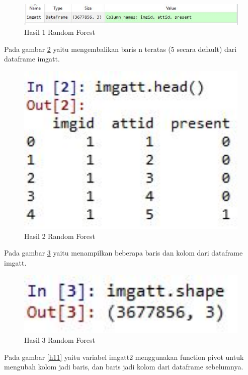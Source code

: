 \begin{enumerate}
\begin{figure}[!htbp]
	\centerline{\includegraphics[width=1\textwidth]{figures/huda/chapter3_praktek/4.JPG}}
	\caption{Hasil 1 Random Forest}
	\label{h8}
\end{figure}
\subitem Pada gambar \ref{h9} yaitu mengembalikan baris n teratas (5 secara default) dari dataframe imgatt.
\begin{figure}[!htbp]
	\centerline{\includegraphics[width=1\textwidth]{figures/huda/chapter3_praktek/5.JPG}}
	\caption{Hasil 2 Random Forest}
	\label{h9}
\end{figure}
\subitem Pada gambar \ref{h10} yaitu menampilkan beberapa baris dan kolom dari dataframe imgatt.
\begin{figure}[!htbp]
	\centerline{\includegraphics[width=1\textwidth]{figures/huda/chapter3_praktek/6.JPG}}
	\caption{Hasil 3 Random Forest}
	\label{h10}
\end{figure}
\subitem Pada gambar \ref{h11} yaitu variabel imgatt2 menggunakan function pivot untuk mengubah kolom jadi baris, dan baris jadi kolom dari dataframe sebelumnya.

\end{enumerate}
